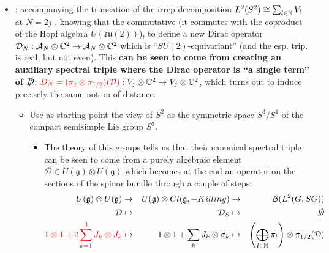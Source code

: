 \documentclass{article}
\newcommand{\alg}[1]{\ensuremath{\mathfrak{#1}}}
\newcommand{\sut}{\ensuremath{\mathfrak{su}(2)}}
\begin{document}
\begin{itemize}
    \item {}: accompanying the truncation of the irrep decomposition $L^2(S^2) \cong \sum_{l \in \mathbb{N}} V_l$ at $N = 2j$ %
    , knowing that the commutative  {\tiny(it commutes with the coproduct of the Hopf algebra $U(\sut)$)}, to define a new Dirac operator $\mathcal D_N: \mathcal A_N \otimes \mathbb{C}^2 \to \mathcal A_N \otimes \mathbb{C}^2$ which is ``$SU(2)$-equivariant'' (and the esp. trip. is real, but not even). This \textbf{can be seen to come from creating an auxiliary spectral triple where the Dirac operator is ``a single term'' of $\slashed D$}: $\textcolor{red}{D_N = (\pi_j \otimes \pi_{1/2})(\mathcal D)}: V_j \otimes \mathbb{C}^2 \to V_j \otimes \mathbb{C}^2$, which turns out to induce precisely the same notion of distance.
    
        \begin{itemize}
        
            \item Use as starting point the view of $S^2$ as the symmetric space $S^3/S^1$ of the compact semisimple Lie group $S^3$.
        
                \begin{itemize}
                    
                \item The theory of this groups tells us that their canonical spectral triple can be seen to come from a purely algebraic element $\mathcal D \in U(\alg g) \otimes U(\alg g)$ which becomes at the end an operator on the sections of the spinor bundle through a couple of steps:
                \begin{align}
                    U(\alg g) \otimes U(\alg g) &\to& U(\alg g) \otimes Cl(\alg g, -Killing) &\to& \mathcal B(L^2(G, SG)) \\
                    \mathcal D  &\mapsto& \mathcal D_S &\mapsto& \slashed D \\
                    \rtext{1 \otimes 1 + 2 \sum_{k = 1}^3 J_k \otimes J_k} &\mapsto& 1 \otimes 1 + \sum_k J_k \otimes \sigma_k &\mapsto& \left( \bigoplus_{l\in \NN} \pi_l \right) \otimes \pi_{1/2}(\mathcal D)
                \end{align}
                

\end{itemize}
\end{itemize}
\end{itemize}
\end{document}
